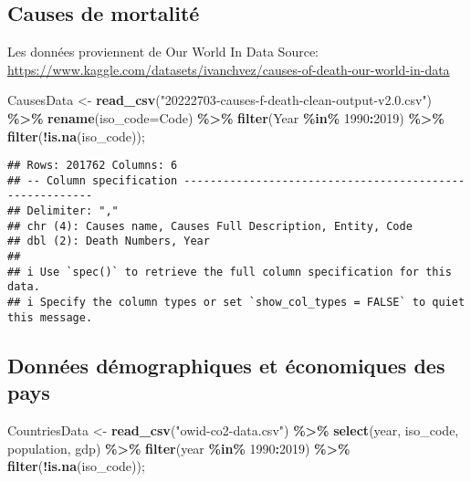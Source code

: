 \documentclass[
]{article}
\newenvironment{Shaded}{\begin{snugshade}}{\end{snugshade}}
\newcommand{\AttributeTok}[1]{\textcolor[rgb]{0.13,0.29,0.53}{#1}}
\newcommand{\DecValTok}[1]{\textcolor[rgb]{0.00,0.00,0.81}{#1}}
\newcommand{\FunctionTok}[1]{\textcolor[rgb]{0.13,0.29,0.53}{\textbf{#1}}}
\newcommand{\NormalTok}[1]{#1}
\newcommand{\OtherTok}[1]{\textcolor[rgb]{0.56,0.35,0.01}{#1}}
\newcommand{\SpecialCharTok}[1]{\textcolor[rgb]{0.81,0.36,0.00}{\textbf{#1}}}
\newcommand{\StringTok}[1]{\textcolor[rgb]{0.31,0.60,0.02}{#1}}
\begin{document}
\hypertarget{causes-de-mortalituxe9}{%
\subsection{Causes de mortalité}\label{causes-de-mortalituxe9}}

Les données proviennent de Our World In Data Source:
\url{https://www.kaggle.com/datasets/ivanchvez/causes-of-death-our-world-in-data}

\begin{Shaded}
\begin{Highlighting}[]
\NormalTok{CausesData }\OtherTok{\textless{}{-}} \FunctionTok{read\_csv}\NormalTok{(}\StringTok{"20222703{-}causes{-}f{-}death{-}clean{-}output{-}v2.0.csv"}\NormalTok{) }\SpecialCharTok{\%\textgreater{}\%}
  \FunctionTok{rename}\NormalTok{(}\AttributeTok{iso\_code=}\NormalTok{Code) }\SpecialCharTok{\%\textgreater{}\%}
  \FunctionTok{filter}\NormalTok{(Year }\SpecialCharTok{\%in\%} \DecValTok{1990}\SpecialCharTok{:}\DecValTok{2019}\NormalTok{) }\SpecialCharTok{\%\textgreater{}\%}
  \FunctionTok{filter}\NormalTok{(}\SpecialCharTok{!}\FunctionTok{is.na}\NormalTok{(iso\_code));}
\end{Highlighting}
\end{Shaded}

\begin{verbatim}
## Rows: 201762 Columns: 6
## -- Column specification --------------------------------------------------------
## Delimiter: ","
## chr (4): Causes name, Causes Full Description, Entity, Code
## dbl (2): Death Numbers, Year
## 
## i Use `spec()` to retrieve the full column specification for this data.
## i Specify the column types or set `show_col_types = FALSE` to quiet this message.
\end{verbatim}

\hypertarget{donnuxe9es-duxe9mographiques-et-uxe9conomiques-des-pays}{%
\subsection{Données démographiques et économiques des
pays}\label{donnuxe9es-duxe9mographiques-et-uxe9conomiques-des-pays}}

\begin{Shaded}
\begin{Highlighting}[]
\NormalTok{CountriesData }\OtherTok{\textless{}{-}} \FunctionTok{read\_csv}\NormalTok{(}\StringTok{"owid{-}co2{-}data.csv"}\NormalTok{) }\SpecialCharTok{\%\textgreater{}\%}
  \FunctionTok{select}\NormalTok{(year, iso\_code, population, gdp) }\SpecialCharTok{\%\textgreater{}\%}
  \FunctionTok{filter}\NormalTok{(year }\SpecialCharTok{\%in\%} \DecValTok{1990}\SpecialCharTok{:}\DecValTok{2019}\NormalTok{) }\SpecialCharTok{\%\textgreater{}\%}
  \FunctionTok{filter}\NormalTok{(}\SpecialCharTok{!}\FunctionTok{is.na}\NormalTok{(iso\_code));}
\end{Highlighting}
\end{Shaded}
\end{document}
